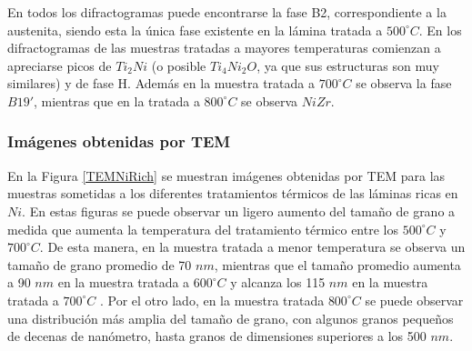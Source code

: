 \documentclass[12pt]{article}
\theoremstyle{definition}
\theoremstyle{remark}
\begin{document}
{En todos los difractogramas puede encontrarse la fase B2, correspondiente a la austenita, siendo esta la única fase existente en la lámina tratada a $500 ^\circ C$. En los difractogramas de las muestras tratadas a mayores temperaturas comienzan a apreciarse picos de $Ti_2Ni$ (o posible $Ti_4Ni_2O$, ya que sus estructuras son muy similares) y de fase H. Además en la muestra tratada a $700 ^\circ C$ se observa la fase $B19'$, mientras que en la tratada a $800 ^\circ C$ se observa $NiZr$.

\subsubsection{Imágenes obtenidas por TEM}

En la Figura \ref{TEMNiRich} se muestran imágenes obtenidas por TEM para las muestras sometidas a los diferentes tratamientos térmicos de las láminas ricas en $Ni$. En estas figuras se puede observar un ligero aumento del tamaño de grano a medida que aumenta la temperatura del tratamiento térmico entre los $500 ^\circ C$ y $700 ^\circ C$. De esta manera, en la muestra tratada a menor temperatura se observa un tamaño de grano promedio de 70 $nm$, mientras que el tamaño promedio aumenta a 90 $nm$ en la muestra tratada a $600 ^\circ C$ y alcanza los 115 $nm$ en la muestra tratada a $700 ^\circ C$ . Por el otro lado, en la muestra tratada $800 ^\circ C$ se puede observar una distribución más amplia del tamaño de grano, con algunos granos pequeños de decenas de nanómetro, hasta granos de dimensiones superiores a los 500 $nm$. 

}
\end{document}
